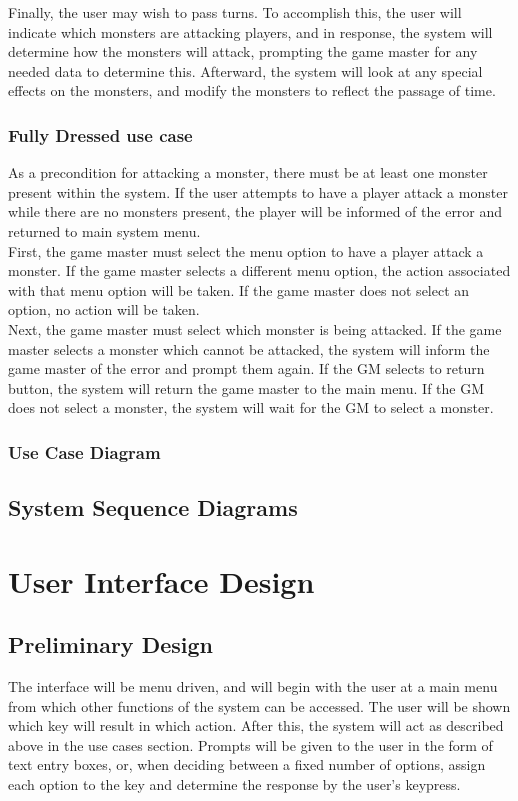\documentclass[letterpaper,12pt]{article}
\begin{document}
Finally, the user may wish to pass turns. To accomplish this, the user
will indicate which monsters are attacking players, and in response,
the system will determine how the monsters will attack, prompting the
game master for any needed data to determine this. Afterward, the
system will look at any special effects on the monsters, and modify
the monsters to reflect the passage of time.\\
\subsubsection{Fully Dressed use case}
As a precondition for attacking a monster, there must be at least one
monster present within the system. If the user attempts to have a
player attack a monster while there are no monsters present, the
player will be informed of the error and returned to main system
menu.\\

First, the game master must select the menu option to have a player attack
a monster. If the game master selects a different menu option, the
action associated with that menu option will be taken. If the game
master does not select an option, no action will be taken.\\

Next, the game master must select which monster is being attacked. If
the game master selects a monster which cannot be attacked, the system
will inform the game master of the error and prompt them again. If the
GM selects to return button, the system will return the game master to
the main menu. If the GM does not select a monster, the system will
wait for the GM to select a monster.\\
\subsubsection{Use Case Diagram}
\subsection{System Sequence Diagrams}
\pagebreak
\section{User Interface Design}

\subsection{Preliminary Design}
The interface will be menu driven, and will begin with the user at a
main menu from which other functions of the system can be
accessed. The user will be shown which key will result in which
action. After this, the system will act as described above in the use
cases section. Prompts will be given to the user in the form of text
entry boxes, or, when deciding between a fixed number of options,
assign each option to the key and determine the response by the user's
keypress.
\end{document}
